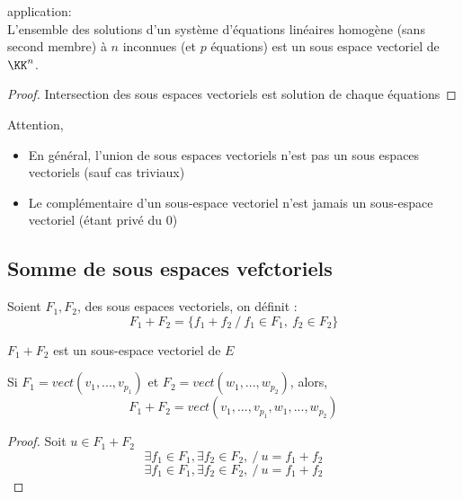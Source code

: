 \documentclass[../main.tex]{subfile}
\begin{document}
application:\\
L'ensemble des solutions d'un système d'équations linéaires homogène (sans second membre) à $n$ inconnues (et $p$ équations) est un sous espace vectoriel de $\KK^n$.\\

\begin{proof}
	Intersection des sous espaces vectoriels est solution de chaque équations
\end{proof}

\begin{rema}
	Attention, \\
\begin{itemize}	
	\item En général, l'union de sous espaces vectoriels n'est pas un sous espaces vectoriels (sauf cas triviaux)
	\item Le complémentaire d'un sous-espace vectoriel n'est jamais un sous-espace vectoriel (étant privé du $0$)
\end{itemize}
\end{rema}

\subsection{Somme de sous espaces vefctoriels}
\begin{defi}
	Soient $F_1, F_2$, des sous espaces vectoriels, on définit :
	$$F_1 + F_2 = \{f_1 + f_2 \ / \ f_1 \in F_1 , \ f_2 \in F_2\}$$
\end{defi}

\begin{rema}
	$F_1 + F_2$ est un sous-espace vectoriel de $E$
\end{rema}

\begin{ex}
\end{ex}

\begin{prop}
	Si $F_1 = vect(v_1, ..., v_{p_1})$ et $F_2 = vect(w_1, ..., w_{p_2})$, alors, \\
	$$F_1 + F_2 = vect(v_1, ..., v_{p_1}, w_1, ..., w_{p_2})$$
\end{prop}

\begin{proof}
	Soit $u \in F_1 + F_2$\\
	$$\exists f_1 \in F_1, \exists f_2 \in F_2, \ / \ u = f_1 + f_2$$
	$$\exists f_1 \in F_1, \exists f_2 \in F_2, \ / \ u = f_1 + f_2$$
\end{proof}
\end{document}
